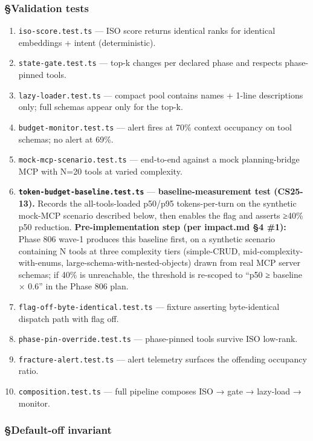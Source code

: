 \documentclass[11pt,letterpaper]{article}
\providecommand{\tightlist}{\setlength{\itemsep}{0pt}\setlength{\parskip}{0pt}}
\begin{document}
\subsubsection{§Validation tests}

\begin{enumerate}
\def\labelenumi{\arabic{enumi}.}
\tightlist
\item
  \texttt{iso-score.test.ts} --- ISO score returns identical ranks for
  identical embeddings + intent (deterministic).
\item
  \texttt{state-gate.test.ts} --- top-k changes per declared phase and
  respects phase-pinned tools.
\item
  \texttt{lazy-loader.test.ts} --- compact pool contains names + 1-line
  descriptions only; full schemas appear only for the top-k.
\item
  \texttt{budget-monitor.test.ts} --- alert fires at 70\% context
  occupancy on tool schemas; no alert at 69\%.
\item
  \texttt{mock-mcp-scenario.test.ts} --- end-to-end against a mock
  planning-bridge MCP with N=20 tools at varied complexity.
\item
  \textbf{\texttt{token-budget-baseline.test.ts}} ---
  \textbf{baseline-measurement test (CS25-13).} Records the
  all-tools-loaded p50/p95 tokens-per-turn on the synthetic mock-MCP
  scenario described below, then enables the flag and asserts ≥40\% p50
  reduction. \textbf{Pre-implementation step (per impact.md §4 \#1):}
  Phase 806 wave-1 produces this baseline first, on a synthetic scenario
  containing N tools at three complexity tiers (simple-CRUD,
  mid-complexity-with-enums, large-schema-with-nested-objects) drawn
  from real MCP server schemas; if 40\% is unreachable, the threshold is
  re-scoped to ``p50 ≥ baseline × 0.6'' in the Phase 806 plan.
\item
  \texttt{flag-off-byte-identical.test.ts} --- fixture asserting
  byte-identical dispatch path with flag off.
\item
  \texttt{phase-pin-override.test.ts} --- phase-pinned tools survive ISO
  low-rank.
\item
  \texttt{fracture-alert.test.ts} --- alert telemetry surfaces the
  offending occupancy ratio.
\item
  \texttt{composition.test.ts} --- full pipeline composes ISO → gate →
  lazy-load → monitor.
\end{enumerate}

\subsubsection{§Default-off invariant}
\end{document}
